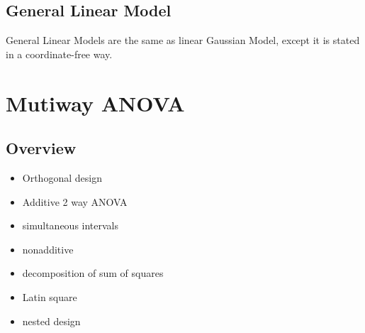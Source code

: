 \documentclass[11pt,fleqn]{book} %
\begin{document}
 \section{General Linear Model}

\begin{definition}
	General Linear Models are the same as linear Gaussian Model, except it is stated in a coordinate-free way. 
\end{definition}












\chapter{Mutiway ANOVA}

\section{Overview}

\begin{itemize}
	\item Orthogonal design
	\item Additive 2 way ANOVA
	\item simultaneous intervals
	\item nonadditive
	\item decomposition of sum of squares
	\item Latin square
	\item nested design
\end{itemize}

\end{document}
